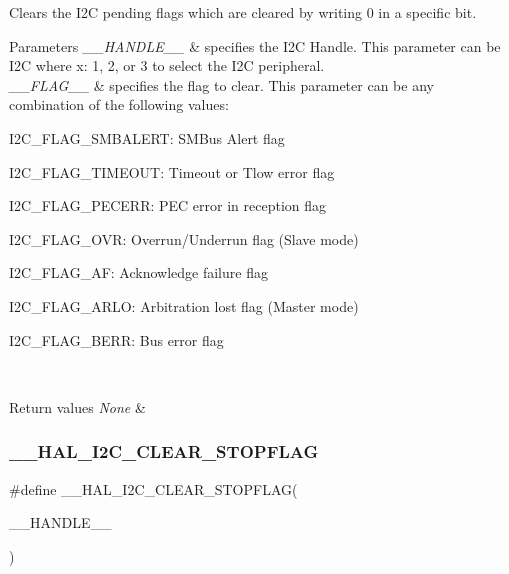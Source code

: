 Clears the I2C pending flags which are cleared by writing 0 in a specific bit. 


\begin{DoxyParams}{Parameters}
{\em \+\_\+\+\_\+\+H\+A\+N\+D\+L\+E\+\_\+\+\_\+} & specifies the I2C Handle. This parameter can be I2C where x\+: 1, 2, or 3 to select the I2C peripheral. \\
\hline
{\em \+\_\+\+\_\+\+F\+L\+A\+G\+\_\+\+\_\+} & specifies the flag to clear. This parameter can be any combination of the following values\+: \begin{DoxyItemize}
\item I2\+C\+\_\+\+F\+L\+A\+G\+\_\+\+S\+M\+B\+A\+L\+E\+RT\+: S\+M\+Bus Alert flag \item I2\+C\+\_\+\+F\+L\+A\+G\+\_\+\+T\+I\+M\+E\+O\+UT\+: Timeout or Tlow error flag \item I2\+C\+\_\+\+F\+L\+A\+G\+\_\+\+P\+E\+C\+E\+RR\+: P\+EC error in reception flag \item I2\+C\+\_\+\+F\+L\+A\+G\+\_\+\+O\+VR\+: Overrun/\+Underrun flag (Slave mode) \item I2\+C\+\_\+\+F\+L\+A\+G\+\_\+\+AF\+: Acknowledge failure flag \item I2\+C\+\_\+\+F\+L\+A\+G\+\_\+\+A\+R\+LO\+: Arbitration lost flag (Master mode) \item I2\+C\+\_\+\+F\+L\+A\+G\+\_\+\+B\+E\+RR\+: Bus error flag \end{DoxyItemize}
\\
\hline
\end{DoxyParams}

\begin{DoxyRetVals}{Return values}
{\em None} & \\
\hline
\end{DoxyRetVals}
\mbox{\label{group___i2_c___exported___macros_gae8e94c16809df16411862b11fea781db}} 
\subsubsection{\texorpdfstring{\+\_\+\+\_\+\+H\+A\+L\+\_\+\+I2\+C\+\_\+\+C\+L\+E\+A\+R\+\_\+\+S\+T\+O\+P\+F\+L\+AG}{\_\_HAL\_I2C\_CLEAR\_STOPFLAG}}
{\footnotesize\ttfamily \#define \+\_\+\+\_\+\+H\+A\+L\+\_\+\+I2\+C\+\_\+\+C\+L\+E\+A\+R\+\_\+\+S\+T\+O\+P\+F\+L\+AG(\begin{DoxyParamCaption}\item[{}]{\+\_\+\+\_\+\+H\+A\+N\+D\+L\+E\+\_\+\+\_\+ }\end{DoxyParamCaption})}

